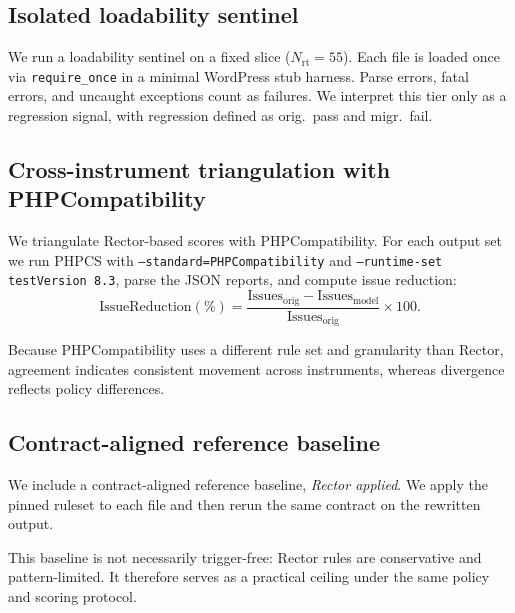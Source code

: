\subsection{Isolated loadability sentinel}
\label{sec:pce_loadability}

We run a loadability sentinel on a fixed slice ($N_{\mathrm{rt}}=55$). Each file is loaded once via \texttt{require\_once} in a minimal WordPress stub harness. Parse errors, fatal errors, and uncaught exceptions count as failures. We interpret this tier only as a regression signal, with regression defined as orig.\ pass and migr.\ fail.

\subsection{Cross-instrument triangulation with PHPCompatibility}
\label{sec:pce_phpcompat}

We triangulate Rector-based scores with PHPCompatibility.\cite{phpcompat} For each output set we run PHPCS with \texttt{--standard=PHPCompatibility} and \texttt{--runtime-set testVersion 8.3}, parse the JSON reports, and compute issue reduction:
\[
\text{IssueReduction}(\%)=
\frac{\text{Issues}_{\mathrm{orig}}-\text{Issues}_{\mathrm{model}}}
{\text{Issues}_{\mathrm{orig}}}\times 100.
\]

Because PHPCompatibility uses a different rule set and granularity than Rector, agreement indicates consistent movement across instruments, whereas divergence reflects policy differences.

\subsection{Contract-aligned reference baseline}
\label{sec:pce_baseline}

We include a contract-aligned reference baseline, \emph{Rector applied}. We apply the pinned ruleset to each file and then rerun the same contract on the rewritten output.

This baseline is not necessarily trigger-free: Rector rules are conservative and pattern-limited. It therefore serves as a practical ceiling under the same policy and scoring protocol.